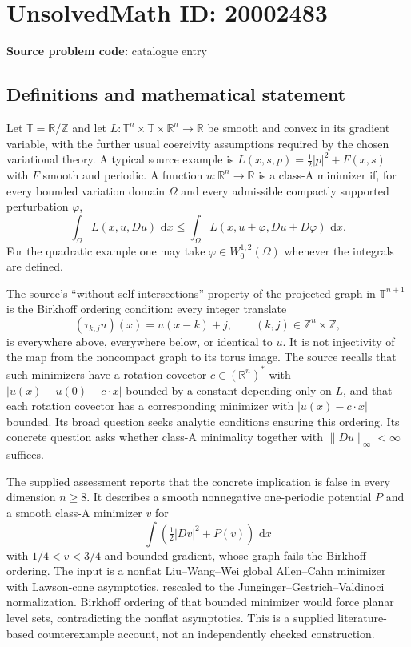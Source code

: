 \documentclass[11pt]{article}
\newcommand{\Z}{\mathbb{Z}}
\newcommand{\R}{\mathbb{R}}
\newcommand{\dd}{\,\mathrm{d}}
\begin{document}
\section*{UnsolvedMath ID: 20002483}
\textbf{Source problem code:} catalogue entry
\subsection{Definitions and mathematical statement}
Let $\mathbb T=\R/\Z$ and let $L:\mathbb T^n\times\mathbb T\times\R^n\to\R$ be smooth and convex in its gradient variable, with the further usual coercivity assumptions required by the chosen variational theory. A typical source example is $L(x,s,p)=\tfrac12|p|^2+F(x,s)$ with $F$ smooth and periodic. A function $u:\R^n\to\R$ is a class-A minimizer if, for every bounded variation domain $\Omega$ and every admissible compactly supported perturbation $\varphi$,
\[
 \int_\Omega L(x,u,Du)\,\dd x
 \le\int_\Omega L(x,u+\varphi,Du+D\varphi)\,\dd x.
\]
For the quadratic example one may take $\varphi\in W^{1,2}_0(\Omega)$ whenever the integrals are defined.

The source's ``without self-intersections'' property of the projected graph in $\mathbb T^{n+1}$ is the Birkhoff ordering condition: every integer translate
\[
 (\tau_{k,j}u)(x)=u(x-k)+j,\qquad(k,j)\in\Z^n\times\Z,
\]
is everywhere above, everywhere below, or identical to $u$. It is not injectivity of the map from the noncompact graph to its torus image. The source recalls that such minimizers have a rotation covector $c\in(\R^n)^*$ with $|u(x)-u(0)-c\cdot x|$ bounded by a constant depending only on $L$, and that each rotation covector has a corresponding minimizer with $|u(x)-c\cdot x|$ bounded. Its broad question seeks analytic conditions ensuring this ordering. Its concrete question asks whether class-A minimality together with $\|Du\|_\infty<\infty$ suffices.

The supplied assessment reports that the concrete implication is false in every dimension $n\ge8$. It describes a smooth nonnegative one-periodic potential $P$ and a smooth class-A minimizer $v$ for
\[
 \int\left(\tfrac12|Dv|^2+P(v)\right)\,\dd x
\]
with $1/4<v<3/4$ and bounded gradient, whose graph fails the Birkhoff ordering. The input is a nonflat Liu--Wang--Wei global Allen--Cahn minimizer with Lawson-cone asymptotics, rescaled to the Junginger--Gestrich--Valdinoci normalization. Birkhoff ordering of that bounded minimizer would force planar level sets, contradicting the nonflat asymptotics. This is a supplied literature-based counterexample account, not an independently checked construction.
\end{document}
